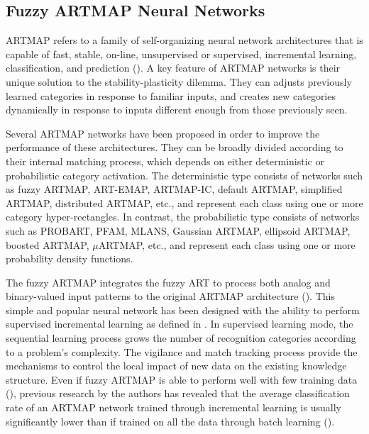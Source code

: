 \subsection{Fuzzy ARTMAP Neural Networks}
\label{sec:c1_fam}

ARTMAP refers to a family of self-organizing neural network architectures that is capable of fast, stable, on-line, unsupervised or supervised, incremental learning, classification, and prediction (\cite{carpenter91}). A key feature of ARTMAP networks is their unique solution to the stability-plasticity dilemma. They can adjusts previously learned categories in response to familiar inputs, and creates new categories dynamically in response to inputs different enough from those previously seen.

Several ARTMAP networks have been proposed in order to improve the performance of these architectures. They can be broadly divided according to their internal matching process, which depends on either deterministic or probabilistic category activation. The deterministic type consists of networks such as fuzzy ARTMAP, ART-EMAP, ARTMAP-IC, default ARTMAP, simplified ARTMAP, distributed ARTMAP, etc., and represent each class using one or more category hyper-rectangles. In contrast, the probabilistic type consists of networks such as PROBART, PFAM, MLANS, Gaussian ARTMAP, ellipsoid ARTMAP, boosted ARTMAP, $\mu$ARTMAP, etc., and represent each class using one or more probability density functions.

The fuzzy ARTMAP integrates the fuzzy ART to process both analog and binary-valued input patterns to the original ARTMAP architecture (\cite{carpenter92}). This simple and popular neural network has been designed with the ability to perform supervised incremental learning as defined in \cite{polikar01}. In supervised learning mode, the sequential learning process grows the number of recognition categories according to a problem's complexity. The vigilance and match tracking process provide the mechanisms to control the local impact of new data on the existing knowledge structure. Even if fuzzy ARTMAP is able to perform well with few training data (\cite{hennegis06}), previous research by the authors has revealed that the average classification rate of an ARTMAP network trained through incremental learning is usually significantly lower than if trained on all the data through batch learning (\cite{granger08, connolly08}).

